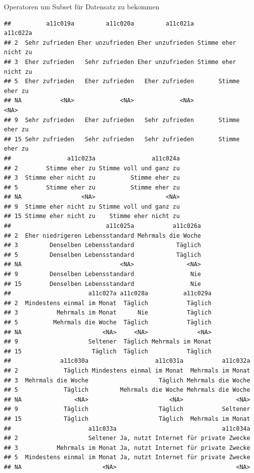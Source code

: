 \documentclass[ignorenonframetext,]{beamer}
\begin{document}
\begin{frame}[fragile]{Operatoren um Subset für Datensatz zu bekommen}
\begin{verbatim}
##          a11c019a         a11c020a         a11c021a             a11c022a
## 2  Sehr zufrieden Eher unzufrieden Eher unzufrieden Stimme eher nicht zu
## 3  Eher zufrieden   Sehr zufrieden Eher unzufrieden Stimme eher nicht zu
## 5  Eher zufrieden   Eher zufrieden   Eher zufrieden       Stimme eher zu
## NA           <NA>             <NA>             <NA>                 <NA>
## 9  Sehr zufrieden   Eher zufrieden   Sehr zufrieden       Stimme eher zu
## 15 Sehr zufrieden   Sehr zufrieden   Sehr zufrieden       Stimme eher zu
##                a11c023a                a11c024a
## 2        Stimme eher zu Stimme voll und ganz zu
## 3  Stimme eher nicht zu          Stimme eher zu
## 5        Stimme eher zu          Stimme eher zu
## NA                 <NA>                    <NA>
## 9  Stimme eher nicht zu Stimme voll und ganz zu
## 15 Stimme eher nicht zu    Stimme eher nicht zu
##                           a11c025a           a11c026a
## 2  Eher niedrigeren Lebensstandard Mehrmals die Woche
## 3         Denselben Lebensstandard            Täglich
## 5         Denselben Lebensstandard            Täglich
## NA                            <NA>               <NA>
## 9         Denselben Lebensstandard                Nie
## 15        Denselben Lebensstandard                Nie
##                      a11c027a a11c028a          a11c029a
## 2  Mindestens einmal im Monat  Täglich           Täglich
## 3           Mehrmals im Monat      Nie           Täglich
## 5          Mehrmals die Woche  Täglich           Täglich
## NA                       <NA>     <NA>              <NA>
## 9                    Seltener  Täglich Mehrmals im Monat
## 15                    Täglich  Täglich           Täglich
##              a11c030a                   a11c031a           a11c032a
## 2             Täglich Mindestens einmal im Monat  Mehrmals im Monat
## 3  Mehrmals die Woche                    Täglich Mehrmals die Woche
## 5             Täglich         Mehrmals die Woche Mehrmals die Woche
## NA               <NA>                       <NA>               <NA>
## 9             Täglich                    Täglich           Seltener
## 15            Täglich                    Täglich  Mehrmals im Monat
##                      a11c033a                              a11c034a
## 2                    Seltener Ja, nutzt Internet für private Zwecke
## 3           Mehrmals im Monat Ja, nutzt Internet für private Zwecke
## 5  Mindestens einmal im Monat Ja, nutzt Internet für private Zwecke
## NA                       <NA>                                  <NA>

\end{verbatim}
\end{frame}
\end{document}
